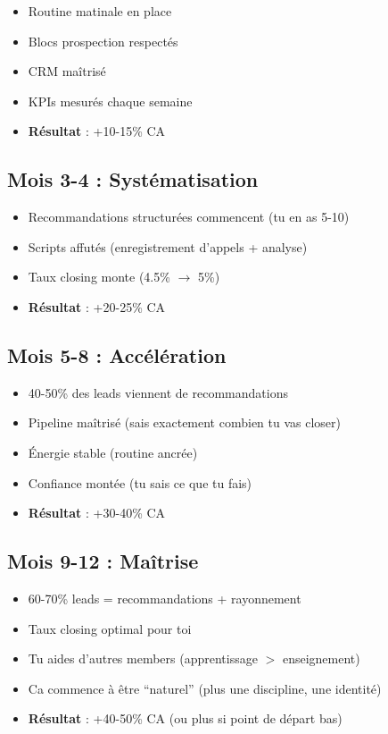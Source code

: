 \documentclass[12pt,a4paper,openany]{book}
\begin{document}
\begin{itemize}
\item Routine matinale en place
\item Blocs prospection respectés
\item CRM maîtrisé
\item KPIs mesurés chaque semaine
\item \textbf{Résultat} : +10-15\% CA
\end{itemize}

\subsection{Mois 3-4 : Systématisation}

\begin{itemize}
\item Recommandations structurées commencent (tu en as 5-10)
\item Scripts affutés (enregistrement d'appels + analyse)
\item Taux closing monte (4.5\% $\rightarrow$ 5\%)
\item \textbf{Résultat} : +20-25\% CA
\end{itemize}

\subsection{Mois 5-8 : Accélération}

\begin{itemize}
\item 40-50\% des leads viennent de recommandations
\item Pipeline maîtrisé (sais exactement combien tu vas closer)
\item Énergie stable (routine ancrée)
\item Confiance montée (tu sais ce que tu fais)
\item \textbf{Résultat} : +30-40\% CA
\end{itemize}

\subsection{Mois 9-12 : Maîtrise}

\begin{itemize}
\item 60-70\% leads = recommandations + rayonnement
\item Taux closing optimal pour toi
\item Tu aides d'autres members (apprentissage $>$ enseignement)
\item Ca commence à être ``naturel'' (plus une discipline, une identité)
\item \textbf{Résultat} : +40-50\% CA (ou plus si point de départ bas)
\end{itemize}
\end{document}
